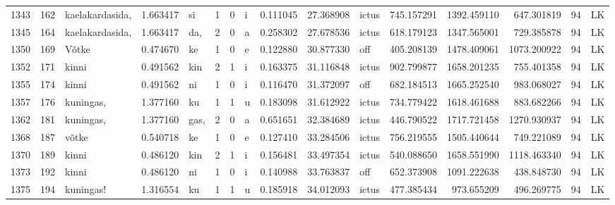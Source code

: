 \begin{tabular}{lrlrllllrrlrrrll}
1343 &         162 &  kaelakardasida, &  1.663417 &      si &        1 &      0 &       i &      0.111045 &     27.368908 &  ictus &   745.157291 &  1392.459110 &   647.301819 &     94 &        LK \\
1345 &         164 &  kaelakardasida, &  1.663417 &     da, &        2 &      0 &       a &      0.258302 &     27.678536 &  ictus &   618.179123 &  1347.565001 &   729.385878 &     94 &        LK \\
1350 &         169 &            Võtke &  0.474670 &      ke &        1 &      0 &       e &      0.122880 &     30.877330 &    off &   405.208139 &  1478.409061 &  1073.200922 &     94 &        LK \\
1352 &         171 &            kinni &  0.491562 &     kin &        2 &      1 &       i &      0.163375 &     31.116848 &  ictus &   902.799877 &  1658.201235 &   755.401358 &     94 &        LK \\
1355 &         174 &            kinni &  0.491562 &      ni &        1 &      0 &       i &      0.116470 &     31.372097 &    off &   682.184513 &  1665.252540 &   983.068027 &     94 &        LK \\
1357 &         176 &        kuningas, &  1.377160 &      ku &        1 &      1 &       u &      0.183098 &     31.612922 &  ictus &   734.779422 &  1618.461688 &   883.682266 &     94 &        LK \\
1362 &         181 &        kuningas, &  1.377160 &    gas, &        2 &      0 &       a &      0.651651 &     32.384689 &  ictus &   446.790522 &  1717.721458 &  1270.930937 &     94 &        LK \\
1368 &         187 &            võtke &  0.540718 &      ke &        1 &      0 &       e &      0.127410 &     33.284506 &  ictus &   756.219555 &  1505.440644 &   749.221089 &     94 &        LK \\
1370 &         189 &            kinni &  0.486120 &     kin &        2 &      1 &       i &      0.156481 &     33.497354 &  ictus &   540.088650 &  1658.551990 &  1118.463340 &     94 &        LK \\
1373 &         192 &            kinni &  0.486120 &      ni &        1 &      0 &       i &      0.140988 &     33.763837 &    off &   652.373908 &  1091.222638 &   438.848730 &     94 &        LK \\
1375 &         194 &        kuningas! &  1.316554 &      ku &        1 &      1 &       u &      0.185918 &     34.012093 &  ictus &   477.385434 &   973.655209 &   496.269775 &     94 &        LK \\

\end{tabular}
